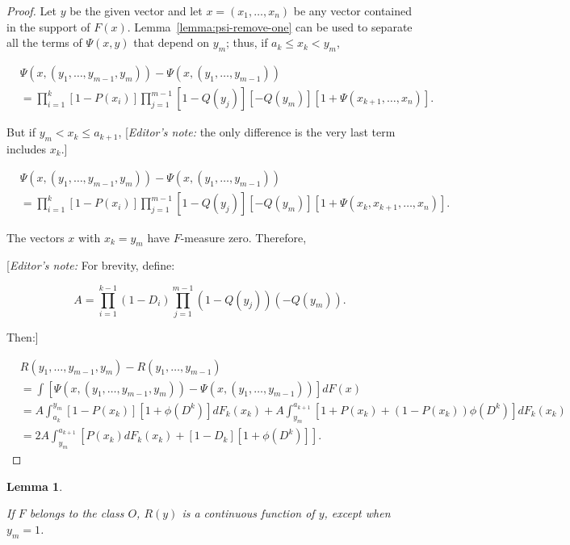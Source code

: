 \documentclass{article}
\newtheorem{lemma}{Lemma}
\theoremstyle{remark}
\begin{document}
\begin{proof}

Let $y$ be the given vector and let $x = (x_1, \dots, x_n)$ be any vector
contained in the support of $F(x)$. Lemma~\ref{lemma:psi-remove-one} can be
used to separate all the terms of $\Psi(x, y)$ that depend on $y_m$; thus, if
$a_k \leq x_k < y_m$,

\[
\begin{aligned}
&\Psi(x, (y_1, \dots, y_{m-1}, y_m)) - \Psi(x, (y_1, \dots, y_{m-1})) \\
&= \prod_{i=1}^k [1 - P(x_i)] \prod_{j=1}^{m-1} [1 - Q(y_j)][-Q(y_m)]
[1 + \Psi(x_{k+1}, \dots, x_n)].
\end{aligned}
\]

But if $y_m < x_k \leq a_{k+1}$, [\emph{Editor's note:} the only difference is
the very last term includes $x_k$.]

\[
\begin{aligned}
&\Psi(x, (y_1, \dots, y_{m-1}, y_m)) - \Psi(x, (y_1, \dots, y_{m-1})) \\
&= \prod_{i=1}^k [1 - P(x_i)] \prod_{j=1}^{m-1} [1 - Q(y_j)][-Q(y_m)]
[1 + \Psi(x_k, x_{k+1}, \dots, x_n)].
\end{aligned}
\]

The vectors $x$ with $x_k = y_m$ have $F$-measure zero. Therefore,

[\emph{Editor's note:} For brevity, define:

\[
A = \prod_{i=1}^{k-1} (1 - D_i) \prod_{j=1}^{m-1} (1 - Q(y_j))(-Q(y_m)).
\]

Then:]

\[
\begin{aligned}
& R(y_1, \dots, y_{m-1}, y_m) - R(y_1, \dots, y_{m-1}) \\
&= \int [\Psi(x, (y_1, \dots, y_{m-1}, y_m)) - \Psi(x, (y_1, \dots, y_{m-1}))] dF(x) \\
&= A \int_{a_k}^{y_m} [1 - P(x_k)][1 + \phi(D^k)] dF_k(x_k)
+ A \int_{y_m}^{a_{k+1}} [1 + P(x_k) + (1 - P(x_k)) \phi(D^k)] dF_k(x_k) \\
&= 2A \int_{y_m}^{a_{k+1}} \left [
    P(x_k) dF_k(x_k) + [1 - D_k][1 + \phi(D^k)]
\right ].
\end{aligned}
\]

\end{proof}

\begin{lemma} \label{lemma:r-is-continuous}

If $F$ belongs to the class $O$, $R(y)$ is a continuous function of $y$, except
when $y_m = 1$.

\end{lemma}
\end{document}

